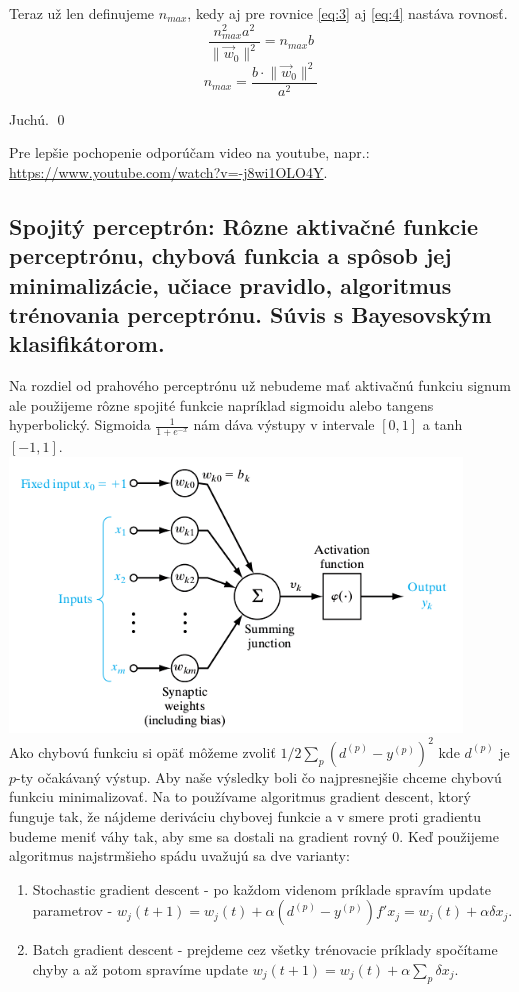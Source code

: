 \documentclass{article}
\numberwithin{equation}{section} %
\begin{document}
Teraz už len definujeme $n_{max}$, kedy aj pre rovnice \ref{eq:3} aj \ref{eq:4} nastáva rovnosť.
$$ \frac{n_{max}^2a^2}{\lVert \overrightarrow{w}_0 \rVert^2} = n_{max}b$$
$$n_{max} = \frac{b\cdot\lVert\overrightarrow{w}_0\rVert^2}{a^2}$$

Juchú. \qed

Pre lepšie pochopenie odporúčam video na youtube, napr.: \url{https://www.youtube.com/watch?v=-j8wi1OLO4Y}.



\subsection{Spojitý perceptrón: Rôzne aktivačné funkcie perceptrónu, chybová funkcia a spôsob jej minimalizácie, učiace pravidlo, algoritmus trénovania perceptrónu. Súvis s Bayesovským klasifikátorom.}
Na rozdiel od prahového perceptrónu už nebudeme mať aktivačnú funkciu signum ale použijeme rôzne spojité funkcie napríklad sigmoidu alebo tangens hyperbolický. Sigmoida $\frac{1}{1 + e^{-x}}$ nám dáva výstupy v intervale $[0, 1]$ a tanh $[-1, 1]$.\\
\includegraphics[width=12cm]{imgs/cont_neuron}\\
Ako chybovú funkciu si opäť môžeme zvoliť $1/2 \sum_p (d^{(p)}- y^{(p)})^2$ kde $d^{(p)}$ je $p$-ty očakávaný výstup. Aby naše výsledky boli čo najpresnejšie chceme chybovú funkciu minimalizovať. Na to používame algoritmus gradient descent, ktorý funguje tak, že nájdeme deriváciu chybovej funkcie a v smere proti gradientu budeme meniť váhy tak, aby sme sa dostali na gradient rovný 0. Keď použijeme algoritmus najstrmšieho spádu uvažujú sa dve varianty:
\begin{enumerate}
\item Stochastic gradient descent - po každom videnom príklade spravím update parametrov - $w_j(t+1) = w_j(t) + \alpha(d^{(p)} - y^{(p)})f'x_j = w_j(t) + \alpha\delta x_j$. 
\item Batch gradient descent - prejdeme cez všetky trénovacie príklady spočítame chyby a až potom spravíme update $w_j(t+1) = w_j(t) + \alpha \sum_p \delta x_j$.
\end{enumerate}
\end{document}
